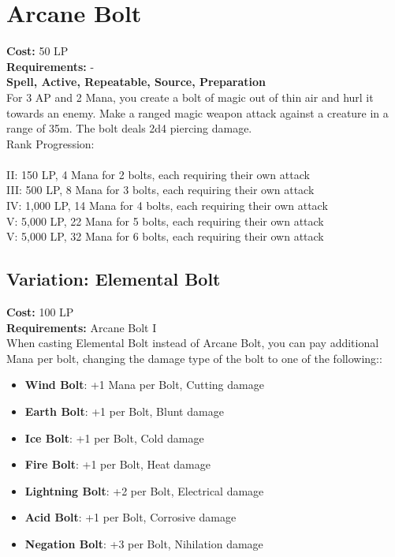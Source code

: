 \section{Arcane Bolt}\label{spell:arcaneBolt}
\textbf{Cost:} 50 LP\\
\textbf{Requirements:} -\\
\textbf{Spell, Active, Repeatable, Source, Preparation}\\
For 3 AP and 2 Mana, you create a bolt of magic out of thin air and hurl it towards an enemy.
Make a ranged magic weapon attack against a creature in a range of 35m.
The bolt deals 2d4 piercing damage.
\\
Rank Progression:\\
\\
II: 150 LP, 4 Mana for 2 bolts, each requiring their own attack\\
III: 500 LP, 8 Mana for 3 bolts, each requiring their own attack\\
IV: 1,000 LP, 14 Mana for 4 bolts, each requiring their own attack\\
V: 5,000 LP, 22 Mana for 5 bolts, each requiring their own attack\\
V: 5,000 LP, 32 Mana for 6 bolts, each requiring their own attack\\

\subsection{Variation: Elemental Bolt}\label{spell:elementalBolt}
\textbf{Cost:} 100 LP\\
\textbf{Requirements:} Arcane Bolt I\\
When casting Elemental Bolt instead of Arcane Bolt, you can pay additional Mana per bolt, changing the damage type of the bolt to one of the following::\\
\begin{itemize}
    \item \textbf{Wind Bolt}: +1 Mana per Bolt, Cutting damage
    \item \textbf{Earth Bolt}: +1 per Bolt, Blunt damage
    \item \textbf{Ice Bolt}: +1 per Bolt, Cold damage
    \item \textbf{Fire Bolt}: +1 per Bolt, Heat damage
    \item \textbf{Lightning Bolt}: +2 per Bolt, Electrical damage
    \item \textbf{Acid Bolt}: +1 per Bolt, Corrosive damage
    \item \textbf{Negation Bolt}: +3 per Bolt, Nihilation damage
\end{itemize}
